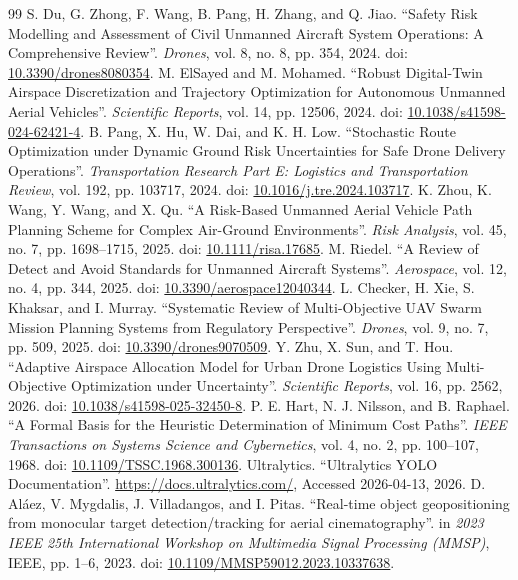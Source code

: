 \documentclass[a4paper,11pt]{article}
\begin{document}
\begin{thebibliography}{99}
S. Du, G. Zhong, F. Wang, B. Pang, H. Zhang, and Q. Jiao. ``Safety Risk Modelling and Assessment of Civil Unmanned Aircraft System Operations: A Comprehensive Review''. \emph{Drones}, vol. 8, no. 8, pp. 354, 2024. doi: \url{10.3390/drones8080354}.
M. ElSayed and M. Mohamed. ``Robust Digital-Twin Airspace Discretization and Trajectory Optimization for Autonomous Unmanned Aerial Vehicles''. \emph{Scientific Reports}, vol. 14, pp. 12506, 2024. doi: \url{10.1038/s41598-024-62421-4}.
B. Pang, X. Hu, W. Dai, and K. H. Low. ``Stochastic Route Optimization under Dynamic Ground Risk Uncertainties for Safe Drone Delivery Operations''. \emph{Transportation Research Part E: Logistics and Transportation Review}, vol. 192, pp. 103717, 2024. doi: \url{10.1016/j.tre.2024.103717}.
K. Zhou, K. Wang, Y. Wang, and X. Qu. ``A Risk-Based Unmanned Aerial Vehicle Path Planning Scheme for Complex Air-Ground Environments''. \emph{Risk Analysis}, vol. 45, no. 7, pp. 1698--1715, 2025. doi: \url{10.1111/risa.17685}.
M. Riedel. ``A Review of Detect and Avoid Standards for Unmanned Aircraft Systems''. \emph{Aerospace}, vol. 12, no. 4, pp. 344, 2025. doi: \url{10.3390/aerospace12040344}.
L. Checker, H. Xie, S. Khaksar, and I. Murray. ``Systematic Review of Multi-Objective UAV Swarm Mission Planning Systems from Regulatory Perspective''. \emph{Drones}, vol. 9, no. 7, pp. 509, 2025. doi: \url{10.3390/drones9070509}.
Y. Zhu, X. Sun, and T. Hou. ``Adaptive Airspace Allocation Model for Urban Drone Logistics Using Multi-Objective Optimization under Uncertainty''. \emph{Scientific Reports}, vol. 16, pp. 2562, 2026. doi: \url{10.1038/s41598-025-32450-8}.
P. E. Hart, N. J. Nilsson, and B. Raphael. ``A Formal Basis for the Heuristic Determination of Minimum Cost Paths''. \emph{IEEE Transactions on Systems Science and Cybernetics}, vol. 4, no. 2, pp. 100--107, 1968. doi: \url{10.1109/TSSC.1968.300136}.
Ultralytics. ``Ultralytics YOLO Documentation''. \url{https://docs.ultralytics.com/}, Accessed 2026-04-13, 2026.
D. Al{\'a}ez, V. Mygdalis, J. Villadangos, and I. Pitas. ``Real-time object geopositioning from monocular target detection/tracking for aerial cinematography''. in \emph{2023 IEEE 25th International Workshop on Multimedia Signal Processing (MMSP)}, IEEE, pp. 1--6, 2023. doi: \url{10.1109/MMSP59012.2023.10337638}.
\end{thebibliography}
\end{document}
